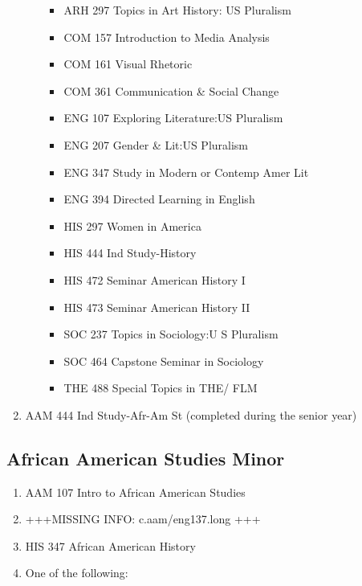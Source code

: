 \documentclass[
  letterpaper,
]{scrbook}
\providecommand{\tightlist}{%
  \setlength{\itemsep}{0pt}\setlength{\parskip}{0pt}}
\begin{document}
\begin{enumerate}
\begin{itemize}
    \begin{itemize}
    \tightlist
    \item
      ARH 297 Topics in Art History: US Pluralism
    \item
      COM 157 Introduction to Media Analysis
    \item
      COM 161 Visual Rhetoric
    \item
      COM 361 Communication \& Social Change
    \item
      ENG 107 Exploring Literature:US Pluralism
    \item
      ENG 207 Gender \& Lit:US Pluralism
    \item
      ENG 347 Study in Modern or Contemp Amer Lit
    \item
      ENG 394 Directed Learning in English
    \item
      HIS 297 Women in America
    \item
      HIS 444 Ind Study-History
    \item
      HIS 472 Seminar American History I
    \item
      HIS 473 Seminar American History II
    \item
      SOC 237 Topics in Sociology:U S Pluralism
    \item
      SOC 464 Capstone Seminar in Sociology
    \item
      THE 488 Special Topics in THE/ FLM
    \end{itemize}
  \end{itemize}
\item
  AAM 444 Ind Study-Afr-Am St (completed during the senior year)
\end{enumerate}

\subsection{African American Studies
Minor}\label{african-american-studies-minor}

\begin{enumerate}
\def\labelenumi{\arabic{enumi}.}
\tightlist
\item
  AAM 107 Intro to African American Studies\\
\item
  +++MISSING INFO: c.aam/eng137.long +++
\item
  HIS 347 African American History\\
\item
  One of the following:
\end{enumerate}
\end{document}
